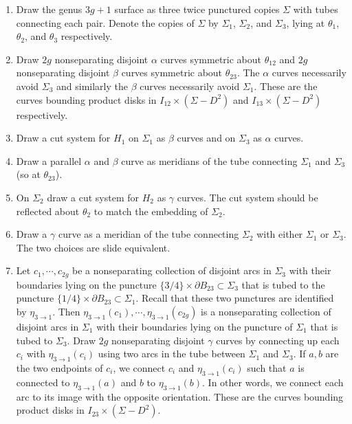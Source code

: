 \documentclass[12pt]{amsart}
\newcommand{\del}{\partial }
\theoremstyle{definition}
\theoremstyle{remark}
\begin{document}
\begin{enumerate}
\item Draw the genus $3g+1$ surface as three twice punctured copies $\Sigma$ with tubes connecting each pair.
Denote the copies of $\Sigma$ by $\Sigma_1$, $\Sigma_2$, and $\Sigma_3$, lying at $\theta_1$, $\theta_2$, and $\theta_3$ respectively.
\item Draw $2g$ nonseparating disjoint $\alpha$ curves symmetric about $\theta_{12}$ and $2g$ nonseparating disjoint $\beta$ curves symmetric about $\theta_{23}$.
The $\alpha$ curves necessarily avoid $\Sigma_3$ and similarly the $\beta$ curves necessarily avoid $\Sigma_1$.
These are the curves bounding product disks in $I_{12} \times (\Sigma - D^2)$ and $I_{13} \times (\Sigma - D^2)$ respectively.
\item Draw a cut system for $H_1$ on $\Sigma_1$ as $\beta$ curves and on $\Sigma_3$ as $\alpha$ curves.
\item Draw a parallel $\alpha$ and $\beta$ curve as meridians of the tube connecting  $\Sigma_1$ and $\Sigma_3$ (so at $\theta_{23}$).

\item On $\Sigma_2$ draw a cut system for $H_2$ as $\gamma$ curves.
The cut system should be reflected about $\theta_2$ to match the embedding of $\Sigma_2$.
\item Draw a $\gamma$ curve as a meridian of the tube connecting $\Sigma_2$ with either $\Sigma_1$ or $\Sigma_3$.
The two choices are slide equivalent.
\item Let $c_1,\cdots,c_{2g}$ be a nonseparating collection of disjoint arcs in $\Sigma_3$ with their boundaries lying on the puncture $\{3/4\} \times \del B_{23} \subset \Sigma_3$ that is tubed to the puncture $\{1/4\} \times \del B_{23} \subset \Sigma_1$.
Recall that these two punctures are identified by $\eta_{3 \to 1}$.
Then $\eta_{3 \to 1}(c_1),\cdots,\eta_{3 \to 1}(c_{2g})$ is a nonseparating collection of disjoint arcs in $\Sigma_1$ with their boundaries lying on the puncture of $\Sigma_1$ that is tubed to $\Sigma_3$.
Draw $2g$ nonseparating disjoint $\gamma$ curves by connecting up each $c_i$ with $\eta_{3 \to 1}(c_i)$ using two arcs in the tube between $\Sigma_1$ and $\Sigma_3$.
If $a,b$ are the two endpoints of $c_i$, we connect $c_i$ and $\eta_{3 \to 1}(c_i)$ such that $a$ is connected to $\eta_{3 \to 1}(a)$ and $b$ to $\eta_{3 \to 1}(b)$.
In other words, we connect each arc to its image with the opposite orientation.
These are the curves bounding product disks in $I_{23} \times (\Sigma - D^2)$.
\end{enumerate}
\end{document}
